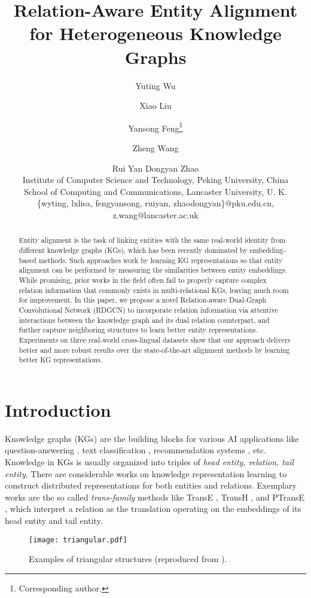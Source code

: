 \documentclass{article}
\title{Relation-Aware Entity Alignment for Heterogeneous Knowledge Graphs}
\author{
Yuting Wu\and
Xiao Liu\and
Yansong Feng\footnote{Corresponding author.}\and
Zheng Wang\and
Rui Yan\And
Dongyan Zhao\\
\affiliations
Institute of Computer Science and Technology, Peking University, China\\
School of Computing and Communications, Lancaster University, U. K.\\
\emails
\{wyting, lxlisa, fengyansong, ruiyan, zhaodongyan\}@pku.edu.cn,
z.wang@lancaster.ac.uk 
}
\begin{document}
\maketitle

\begin{abstract}
	
	Entity alignment is the task of linking entities with the same real-world identity from different knowledge graphs (KGs), which has been recently dominated by embedding-based methods. Such approaches work by learning KG representations so that entity alignment can be performed by measuring the similarities between entity embeddings. While promising, prior works in the field often fail to properly capture complex relation information that commonly exists in multi-relational KGs, leaving much room for improvement. In this paper, we propose a novel Relation-aware Dual-Graph Convolutional Network (RDGCN) to incorporate relation information via attentive interactions between the knowledge graph and its dual relation counterpart, and further capture neighboring structures to learn better entity representations. Experiments on three real-world cross-lingual datasets show that our approach delivers better and more robust results over the state-of-the-art alignment methods by learning better KG representations.
	
\end{abstract}

\section{Introduction}
\label{section:intro} 
Knowledge graphs (KGs) are the building blocks for various AI applications like question-answering \cite{zhang2018variational}, text classification \cite{wang2016text}, recommendation
systems \cite{zhang2016collaborative}, etc. Knowledge in KGs is usually organized into triples of \emph{head entity, relation, tail entity}. There are considerable works on knowledge representation learning to construct distributed representations for both entities and relations. Exemplary works are the so called \emph{trans-family} methods like
TransE \cite{bordes2013translating}, TransH \cite{wang2014knowledge}, and PTransE \cite{lin2015modeling},
which interpret a relation as the translation operating on the embeddings of its head entity and tail entity. 

\begin{figure}
	\centering
	\texttt{[image: triangular.pdf]}
	\caption{Examples of triangular structures (reproduced from \protect\cite{li2018structural}).}
	\label{triangular}
\end{figure}
\end{document}
